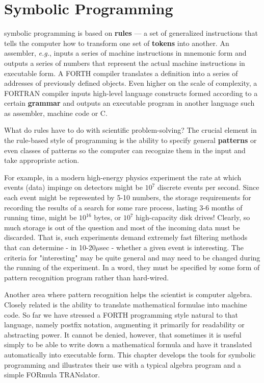 
\chapter{Symbolic Programming}
 symbolic programming is based on \textbf{rules} --- a set of generalized instructions that tells the computer how to transform one set of \textbf{tokens} into another. An assembler, \textit{e.g.}, inputs a series of machine instructions in mnemonic form and outputs a series of numbers that represent the actual machine instructions in executable form. A FORTH compiler translates a definition into a series of addresses of previously defined objects. Even higher on the scale of complexity, a FORTRAN compiler inputs high-level language constructs formed according to a certain \textbf{grammar} and outputs an executable program in another language such as assembler, machine code or C.


What do rules have to do with scientific problem-solving? The crucial element in the rule-based style of programming is the ability to specify general \textbf{patterns} or even classes of patterns so the computer can recognize them in the input and take appropriate action.

For example, in a modern high-energy physics experiment the rate at which events (data) impinge on detectors might be $10^{7}$ discrete events per second. Since each event might be represented by 5-10 numbers, the storage requirements for recording the results of a search for some rare process, lasting 3-6 months of running time, might be $10^16$ bytes, or $10^7$ high-capacity disk drives! Clearly, so much storage is out of the question and most of the incoming data must be discarded. That is, such experiments demand extremely fast filtering methods that can determine - in 10-20$\mu$sec - whether a given event is interesting. The criteria for "interesting" may be quite general and may need to be changed during the running of the experiment. In a word, they must be specified by some form of pattern recognition program rather than hard-wired.

Another area where pattern recognition helps the scientist is computer algebra. Closely related is the ability to translate mathematical formulae into machine code. So far we have stressed a FORTH programming style natural to that language, namely postfix notation, augmenting it primarily for readability or abstracting power. It cannot be denied, however, that sometimes it is useful simply to be able to write down a mathematical formula and have it translated automatically into executable form. This chapter develops the tools for symbolic programming and illustrates their use with a typical algebra program and a simple FORmula TRANslator.

